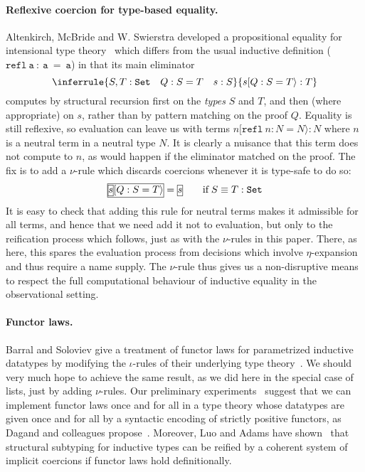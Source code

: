 \paragraph{Reflexive coercion for type-based equality.} Altenkirch,
McBride and W. Swierstra developed a propositional equality for
intensional type theory~\cite{ObsEq} which differs from the usual inductive
definition ($\mathtt{refl~a~:~a~=~a}$) in that its main eliminator
\[
\inferrule{S,T : \mathtt{Set}\quad Q : S = T\quad s : S}
          {s[Q:S=T\rangle : T}
\]
computes by structural recursion first on the \emph{types}
$S$ and $T$, and then (where appropriate) on $s$, rather than
by pattern matching on the proof $Q$. Equality is still
reflexive, so evaluation can leave us with terms
$n[\mathtt{refl}\:n:N=N\rangle : N$
where $n$ is a neutral term in a neutral type $N$. It is clearly
a nuisance that this term does not compute to $n$, as would happen
if the eliminator matched on the proof. The fix is to add a
$\nu$-rule which discards coercions whenever it is type-safe to do so:
\[
  \fbb{\fba{$s$}$[Q:S=T\rangle$} = \fba{$s$}\qquad \mbox{if}\;S\equiv T:\mathtt{Set}
\]
It is easy to check that adding this rule for neutral terms makes it
admissible for all terms, and hence that we need add it not to
evaluation, but only to the reification process which follows, just
as with the $\nu$-rules in this paper. There, as here, this spares
the evaluation process from decisions which involve $\eta$-expansion
and thus require a name supply. The $\nu$-rule thus gives us a non-disruptive
means to respect the full computational behaviour of inductive equality
in the observational setting.

\paragraph{Functor laws.} Barral and Soloviev give a treatment of
functor laws for parametrized inductive datatypes by modifying the
$\iota$-rules of their underlying type
theory~\cite{DBLP:conf/csr/BarralS06}.  We should very much hope to
achieve the same result, as we did here in the special case of lists,
just by adding $\nu$-rules. Our preliminary
experiments~\cite{PigWeekNu} suggest that we can implement functor
laws once and for all in a type theory whose datatypes are given once
and for all by a syntactic encoding of strictly positive functors, as
Dagand and colleagues propose~\cite{Epigram,ElabData}.  Moreover, Luo
and Adams have shown~\cite{DBLP:journals/mscs/LuoA08} that structural
subtyping for inductive types can be reified by a coherent system of
implicit coercions if functor laws hold definitionally.

